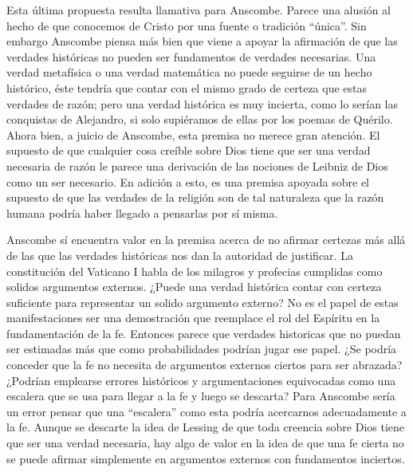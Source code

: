 Esta última propuesta resulta llamativa para Anscombe. Parece una alusión al
hecho de que conocemos de Cristo por una fuente o tradición \enquote{única}. Sin
embargo Anscombe piensa más bien que viene a apoyar la afirmación de que las
verdades históricas no pueden ser fundamentos de verdades necesarias. Una verdad
metafísica o una verdad matemática no puede seguirse de un hecho histórico, éste
tendría que contar con el mismo grado de certeza que estas verdades de razón;
pero una verdad histórica es muy incierta, como lo serían las conquistas de
Alejandro, si solo supiéramos de ellas por los poemas de Quérilo. Ahora bien, a
juicio de Anscombe, esta premisa no merece gran atención. El supuesto de que
cualquier cosa creíble sobre Dios tiene que ser una verdad necesaria de razón le
parece una derivación de las nociones de Leibniz de Dios como un ser necesario.
En adición a esto, es una premisa apoyada sobre el supuesto de que las verdades
de la religión son de tal naturaleza que la razón humana podría haber llegado a
pensarlas por sí misma.

Anscombe sí encuentra valor en la premisa acerca de no afirmar certezas más allá
de las que las verdades históricas nos dan la autoridad de justificar. La
constitución del Vaticano I habla de los milagros y profecias cumplidas como
solidos argumentos externos. ¿Puede una verdad histórica contar con certeza
suficiente para representar un solido argumento externo? No es el papel de estas
manifestaciones ser una demostración que reemplace el rol del Espíritu en la
fundamentación de la fe. Entonces parece que verdades historicas que no puedan
ser estimadas más que como probabilidades podrían jugar ese papel. ¿Se podría
conceder que la fe no necesita de argumentos externos ciertos para ser abrazada?
¿Podrían emplearse errores históricos y argumentaciones equivocadas como una
escalera que se usa para llegar a la fe y luego se descarta? Para Anscombe sería
un error pensar que una \enquote{escalera} como esta podría acercarnos
adecuadamente a la fe. Aunque se descarte la idea de Lessing de que toda
creencia sobre Dios tiene que ser una verdad necesaria, hay algo de valor en la
idea de que una fe cierta no se puede afirmar simplemente en argumentos externos
con fundamentos inciertos.

